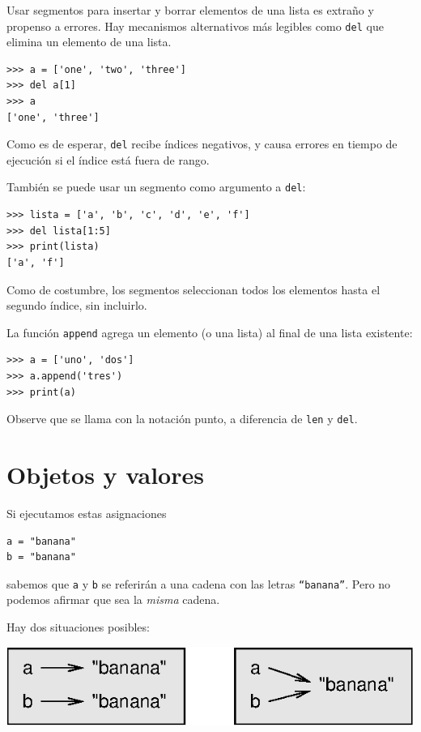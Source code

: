 
Usar segmentos para insertar y borrar elementos de una lista es extraño
y propenso a errores. Hay mecanismos alternativos más legibles como
\texttt{del} que elimina un elemento de una lista.

  
\begin{verbatim}
>>> a = ['one', 'two', 'three']
>>> del a[1]
>>> a
['one', 'three']
\end{verbatim}

Como es de esperar, \texttt{del} recibe índices negativos, y causa
errores en tiempo de ejecución si el índice está fuera de rango.

También se puede usar un segmento como argumento a \texttt{del}:
\begin{verbatim}
>>> lista = ['a', 'b', 'c', 'd', 'e', 'f']
>>> del lista[1:5]
>>> print(lista)
['a', 'f']
\end{verbatim}

Como de costumbre, los segmentos seleccionan todos los elementos hasta
el segundo índice, sin incluirlo.

La función \texttt{append} agrega un elemento (o una lista) al final
de una lista existente:
\begin{verbatim}
>>> a = ['uno', 'dos']
>>> a.append('tres')
>>> print(a)
\end{verbatim}

Observe que se llama con la notación punto, a diferencia de \texttt{len}
y \texttt{del}.

\section{Objetos y valores}

 

Si ejecutamos estas asignaciones
\begin{verbatim}
a = "banana"
b = "banana"
\end{verbatim}

sabemos que \texttt{a} y \texttt{b} se referirán a una cadena con
las letras \texttt{``banana''}. Pero no podemos afirmar que sea
la {\em misma} cadena.

Hay dos situaciones posibles:

\beforefig \centerline{\includegraphics{illustrations/list1}}
\afterfig

